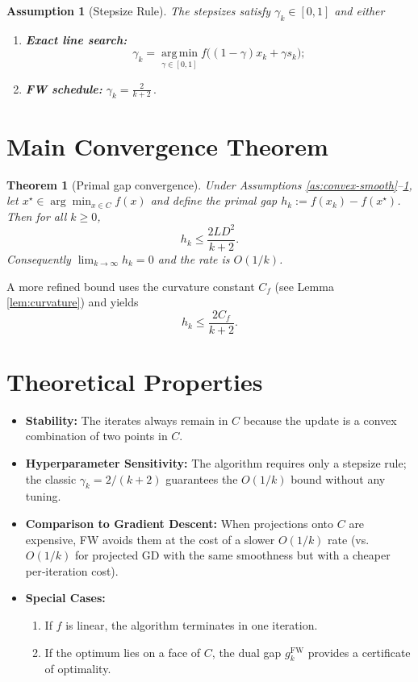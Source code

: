 \documentclass{article}
\newtheorem{theorem}{Theorem}
\newtheorem{assumption}{Assumption}
\newcommand{\argmin}{\operatorname*{arg\,min}}
\begin{document}
\begin{assumption}[Stepsize Rule]
\label{as:stepsize}
The stepsizes satisfy $\gamma_k\in[0,1]$ and either
\begin{enumerate}[label=(\alph*)]
\item \textbf{Exact line search:}
\[
\gamma_k = \argmin_{\gamma\in[0,1]} f\big((1-\gamma)x_k+\gamma s_k\big);
\]
\item \textbf{FW schedule:} $\displaystyle\gamma_k=\frac{2}{k+2}\,.$
\end{enumerate}
\end{assumption}

\section*{Main Convergence Theorem}
\begin{theorem}[Primal gap convergence]
\label{thm:fw-rate}
Under Assumptions \ref{as:convex-smooth}–\ref{as:stepsize},
let $x^\star\in\arg\min_{x\in C}f(x)$ and define the primal gap $h_k:=f(x_k)-f(x^\star)$.  
Then for all $k\ge0$,
\[
h_k \le \frac{2L D^{2}}{k+2}.
\tag{3}
\]
Consequently $\displaystyle \lim_{k\to\infty} h_k =0$ and the rate is $O(1/k)$.
\end{theorem}

A more refined bound uses the curvature constant $C_f$ (see Lemma \ref{lem:curvature}) and yields
\[
h_k \le \frac{2C_f}{k+2}.
\]

\section*{Theoretical Properties}
\begin{itemize}
\item \textbf{Stability:} The iterates always remain in $C$ because the update is a convex combination of two points in $C$.
\item \textbf{Hyperparameter Sensitivity:} The algorithm requires only a stepsize rule; the classic $\gamma_k=2/(k+2)$ guarantees the $O(1/k)$ bound without any tuning.
\item \textbf{Comparison to Gradient Descent:} When projections onto $C$ are expensive, FW avoids them at the cost of a slower $O(1/k)$ rate (vs. $O(1/k)$ for projected GD with the same smoothness but with a cheaper per‑iteration cost).
\item \textbf{Special Cases:}
    \begin{enumerate}
        \item If $f$ is linear, the algorithm terminates in one iteration.
        \item If the optimum lies on a face of $C$, the dual gap $g_k^{\text{FW}}$ provides a certificate of optimality.
    \end{enumerate}
\end{itemize}
\end{document}

